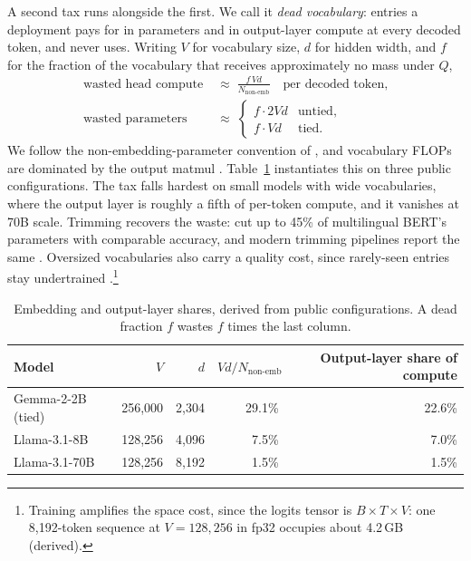 \documentclass{article}
\begin{document}
A second tax runs alongside the first. We call it \emph{dead vocabulary}: entries a deployment pays for in parameters and in output-layer compute at every decoded token, and never uses. Writing $V$ for vocabulary size, $d$ for hidden width, and $f$ for the fraction of the vocabulary that receives approximately no mass under $Q$,
\begin{equation}
\begin{aligned}
\text{wasted head compute} \;&\approx\; \frac{f\,V d}{N_{\text{non-emb}}}
\quad\text{per decoded token,}\\[2pt]
\text{wasted parameters} \;&\approx\;
\begin{cases}
f \cdot 2Vd & \text{untied},\\
f \cdot Vd & \text{tied}.
\end{cases}
\end{aligned}
\label{eq:deadvocab}
\end{equation}
We follow the non-embedding-parameter convention of \citet{kaplan2020scaling}, and vocabulary FLOPs are dominated by the output matmul \citep{tao2024scaling}. Table~\ref{tab:headshare} instantiates this on three public configurations. The tax falls hardest on small models with wide vocabularies, where the output layer is roughly a fifth of per-token compute, and it vanishes at 70B scale. Trimming recovers the waste: \citet{abdaoui2020load} cut up to 45\% of multilingual BERT's parameters with comparable accuracy, and modern trimming pipelines report the same \citep{ushio2023trimming}. Oversized vocabularies also carry a quality cost, since rarely-seen entries stay undertrained \citep{land2024fishing}.\footnote{Training amplifies the space cost, since the logits tensor is $B \times T \times V$: one 8{,}192-token sequence at $V = 128{,}256$ in fp32 occupies about 4.2\,GB (derived).}

\begin{table}[t]
\centering
\small
\begin{tabular}{@{}lrrrr@{}}
\toprule
Model & $V$ & $d$ & $Vd/N_{\text{non-emb}}$ & Output-layer share of compute \\
\midrule
Gemma-2-2B (tied) & 256{,}000 & 2{,}304 & 29.1\% & 22.6\% \\
Llama-3.1-8B & 128{,}256 & 4{,}096 & 7.5\% & 7.0\% \\
Llama-3.1-70B & 128{,}256 & 8{,}192 & 1.5\% & 1.5\% \\
\bottomrule
\end{tabular}
\caption{Embedding and output-layer shares, derived from public configurations. A dead fraction $f$ wastes $f$ times the last column.}
\label{tab:headshare}
\end{table}
\end{document}
